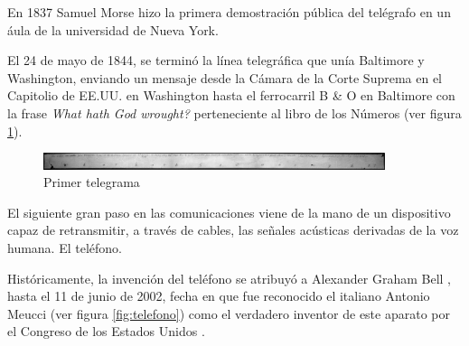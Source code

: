En 1837 Samuel Morse hizo la primera demostración pública del telégrafo en un áula de la universidad de Nueva York. 

El 24 de mayo de 1844, se terminó la línea telegráfica que unía Baltimore y Washington, enviando un mensaje desde la Cámara de la Corte Suprema en el Capitolio de \ac{EE.UU.} en Washington hasta el ferrocarril B \& O en Baltimore con la frase \textit{What hath God wrought?} perteneciente al libro de los Números (ver figura \ref{fig:telegrama}).

\begin{figure}[h!btp]
\centering
\includegraphics[width=100mm, fbox={\fboxrule} 4mm]{images/03-antecedentes/19-primer_telegrama.jpg}
\caption{Primer telegrama}
\label{fig:telegrama}
\end{figure}

El siguiente gran paso en las comunicaciones viene de la mano de un dispositivo capaz de retransmitir, a través de cables, las señales acústicas derivadas de la voz humana. El teléfono.

Históricamente, la invención del teléfono se atribuyó a Alexander Graham Bell \cite{Cab79}, hasta  el 11 de junio de 2002, fecha en que fue reconocido el italiano Antonio Meucci (ver figura \ref{fig:telefono}) como el verdadero inventor de este aparato por el Congreso de los Estados Unidos \cite{Uni03}.

